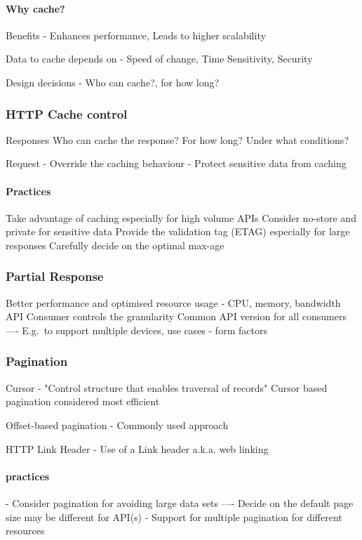 \paragraph{Why cache?}
Benefits - Enhances performance, Leads to higher scalability

Data to cache depends on - Speed of change, Time Sensitivity, Security

Design decisions - Who can cache?, for how long?

\subsubsection{HTTP Cache control}
Responses
Who can cache the response?
For how long?
Under what conditions?

Request
- Override the caching behaviour
- Protect sensitive data from caching

\paragraph{Practices}
Take advantage of caching especially for high volume APIs
Consider no-store and private for sensitive data
Provide the validation tag (ETAG) especially for large responses
Carefully decide on the optimal max-age

\subsubsection{Partial Response}
Better performance and optimised resource usage - CPU, memory, bandwidth
API Consumer controls the granularity
Common API version for all consumers
---- E.g.\ to support multiple devices, use cases - form factors

\subsubsection{Pagination}
Cursor - "Control structure that enables traversal of records"
Cursor based pagination considered most efficient

Offset-based pagination - Commonly used approach %

HTTP Link Header - Use of a Link header a.k.a. web linking

\paragraph{practices}
- Consider pagination for avoiding large data sets
---- Decide on the default page size may be different for API(s)
- Support for multiple pagination for different resources

